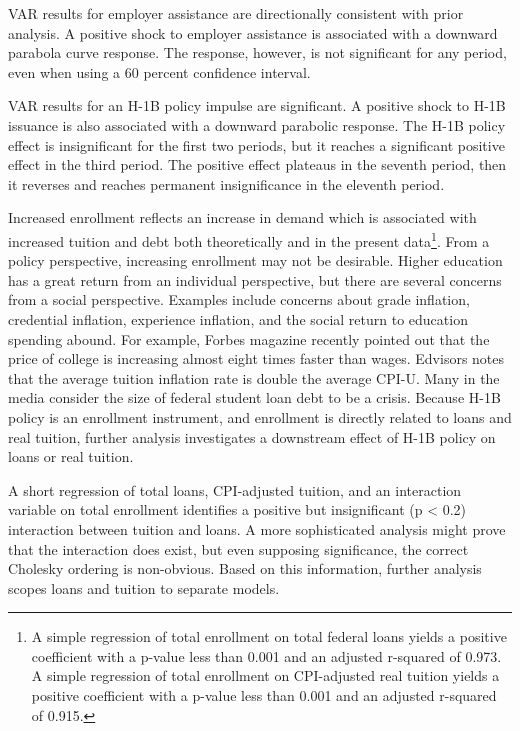 \documentclass[review]{elsarticle}
\begin{document}
VAR results for employer assistance are directionally consistent with prior analysis.
A positive shock to employer assistance is associated with a downward parabola curve response.
The response, however, is not significant for any period, even when using a 60 percent confidence interval.

VAR results for an H-1B policy impulse are significant.
A positive shock to H-1B issuance is also associated with a downward parabolic response.
The H-1B policy effect is insignificant for the first two periods,
but it reaches a significant positive effect in the third period.
The positive effect plateaus in the seventh period,
then it reverses and reaches permanent insignificance in the eleventh period.

Increased enrollment reflects an increase in demand which is associated with
increased tuition and debt both theoretically and in the present data\footnote{
    A simple regression of total enrollment on total federal loans yields a
    positive coefficient with a p-value less than 0.001 and an adjusted r-squared
    of 0.973.
    A simple regression of total enrollment on CPI-adjusted real tuition yields a
    positive coefficient with a p-value less than 0.001 and an adjusted r-squared
    of 0.915.
}.
From a policy perspective, increasing enrollment may not be desirable.
Higher education has a great return from an individual perspective, but there are several concerns from a social perspective.
Examples include concerns about grade inflation, credential inflation, experience inflation,
and the social return to education spending abound.
For example, Forbes magazine recently pointed out that the price of college is increasing almost eight times faster than wages\cite{maldonado2018price}.
Edvisors notes that the average tuition inflation rate is double the average CPI-U\cite{edvisors_2019}.
Many in the media consider the size of federal student loan debt to be a crisis.
Because H-1B policy is an enrollment instrument,
and enrollment is directly related to loans and real tuition,
further analysis investigates a downstream effect of H-1B policy on loans or real tuition.

A short regression of total loans,
CPI-adjusted tuition,
and an interaction variable on total enrollment
identifies a positive but insignificant (p < 0.2)
interaction between tuition and loans.
A more sophisticated analysis might prove that the interaction does exist, but even supposing significance, the correct Cholesky ordering is non-obvious.
Based on this information, further analysis scopes loans and tuition to separate models.
\end{document}
